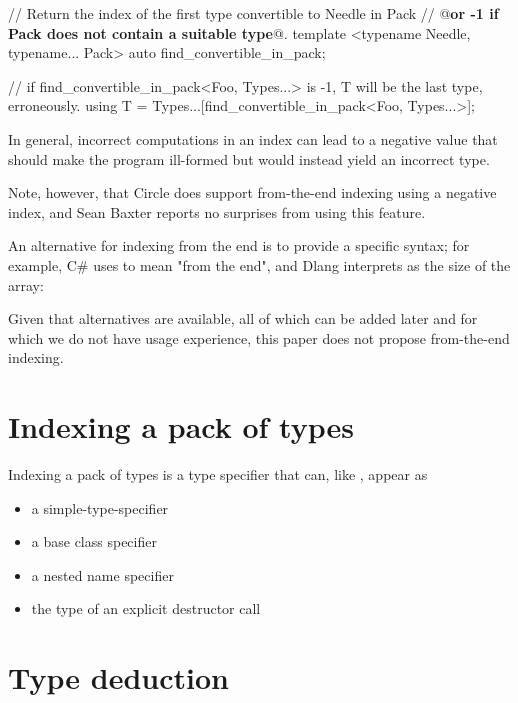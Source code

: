 \documentclass{wg21}
\begin{document}
\begin{colorblock}
// Return the index of the first type convertible to Needle in Pack
// @\textbf{or -1 if Pack does not contain a suitable type}@.
template <typename Needle, typename... Pack>
auto find_convertible_in_pack;

// if find_convertible_in_pack<Foo, Types...> is -1, T will be the last type, erroneously.
using T = Types...[find_convertible_in_pack<Foo, Types...>];
\end{colorblock}

In general, incorrect computations in an index can lead to a negative value that should make the program ill-formed but would instead
yield an incorrect type.

Note, however, that Circle does support from-the-end indexing using a negative index, and Sean Baxter reports no surprises from using this feature.

An alternative for indexing from the end is to provide a specific syntax; for example, C\# uses \tcode{\^{}} to mean "from the end", and Dlang interprets \tcode{\${}}
as the size of the array:

Given that alternatives are available, all of which can be added later and for which we do not have usage experience, this paper does not propose
from-the-end indexing.

\section{Indexing a pack of types}

Indexing a pack of types is a type specifier that can, like , appear as
\begin{itemize}
    \item a simple-type-specifier
    \item a base class specifier
    \item a nested name specifier
    \item the type of an explicit destructor call
\end{itemize}

\section{Type deduction}
\end{document}
